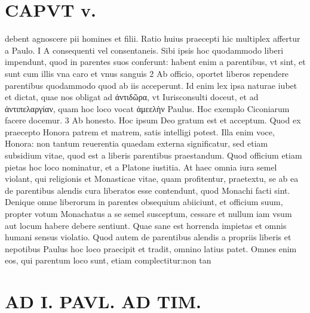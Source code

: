 \documentclass{article}
\begin{document}
\begin{pages}
\section*{CAPVT  v. }
\marginpar{[ p.255 ]}\pstart debent agnoscere pii homines et filii. Ratio huius praecepti hic multiplex affertur a Paulo. I A consequenti vel consentaneis. Sibi ipsis hoc quodammodo liberi impendunt, quod in parentes suos conferunt: habent enim a parentibus, vt sint, et sunt cum illis vna caro et vnus sanguis 2 Ab officio, oportet liberos rependere parentibus quodammodo quod ab iis acceperunt. Id enim lex ipsa naturae iubet et dictat, quae nos obligat ad ἀντιδῶρα, vt Iurisconsulti doceut, et ad ἀντιπελαργίαν, quam hoc loco vocat ἀμεελὴν Paulus. Hoc exemplo Ciconiarum facere docemur. 3 Ab honesto. Hoc ipsum Deo gratum est et acceptum. Quod ex praecepto Honora patrem et matrem, satis intelligi potest. Illa enim voce, Honora: non tantum reuerentia quaedam externa significatur, sed etiam subsidium vitae, quod est a liberis parentibus praestandum. Quod officium etiam pietas hoc loco nominatur, et a Platone iustitia. At haec omnia iura semel violant, qui religionis et Monasticae vitae, quam profitentur, praetextu, se ab ea de parentibus alendis cura liberatos esse contendunt, quod Monachi facti sint. Denique omne liberorum in parentes obsequium abiiciunt, et officium suum, propter votum Monachatus a se semel susceptum, cessare et nullum iam vsum aut locum habere debere sentiunt. Quae sane est horrenda impietas et omnis humani sensus violatio. Quod autem de parentibus alendis a propriis liberis et nepotibus Paulus hoc loco praecipit et tradit, omnino latius patet. Omnes enim eos, qui parentum loco sunt, etiam complectitur:non tan\pend
\section*{AD I. PAVL. AD TIM. }
\marginpar{[ p.256 ]}\pstart {}
{}

\end{pages}
\end{document}
